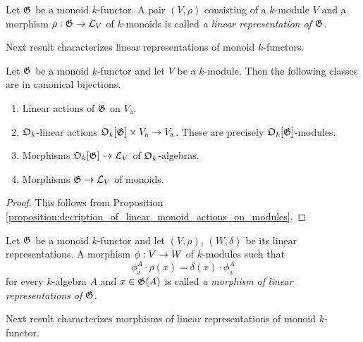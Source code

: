 \begin{definition}
Let ${\mathfrak G}$ be a monoid $k$-functor. A pair $\left(V,\rho\right)$ consisting of a $k$-module $V$ and a morphism $\rho:{\mathfrak G}\rightarrow {\mathcal L}_V$ of $k$-monoids is called \textit{a linear representation of ${\mathfrak G}$}.
\end{definition}
\noindent
Next result characterizes linear representations of monoid $k$-functors.

\begin{corollary}\label{corollary:linear_representations_various_characterizations}
Let ${\mathfrak G}$ be a monoid $k$-functor and let $V$ be a $k$-module. Then the following classes are in canonical bijections.
\begin{enumerate}[label=\emph{\textbf{(\arabic*)}}, leftmargin=1.5em]
\item Linear actions of ${\mathfrak G}$ on $V_{\mathrm{a}}$.
\item ${\mathfrak O}_k$-linear actions ${\mathfrak O}_k[{\mathfrak G}]\times V_{\mathrm{a}}\rightarrow V_{\mathrm{a}}$. These are precisely ${\mathfrak O}_k[{\mathfrak G}]$-modules.
\item Morphisms ${\mathfrak O}_k[{\mathfrak G}]\rightarrow {\mathcal L}_V$ of ${\mathfrak O}_k$-algebras.
\item Morphisms ${\mathfrak G}\rightarrow {\mathcal L}_V$ of monoids.
\end{enumerate}
\end{corollary}
\begin{proof}
This follows from Proposition \ref{proposition:decription_of_linear_monoid_actions_on_modules}.
\end{proof}

\begin{definition}
Let ${\mathfrak G}$ be a monoid $k$-functor and let $(V,\rho)$, $(W,\delta)$ be its linear representations. A morphism $\phi:V\rightarrow W$ of $k$-modules such that
$$\phi_{\mathrm{a}}^A \cdot \rho(x) = \delta(x) \cdot \phi_{\mathrm{a}}^A$$
for every $k$-algebra $A$ and $x\in {\mathfrak G}(A)$ is called \textit{a morphism of linear representations of ${\mathfrak G}$}.
\end{definition}
\noindent
Next result characterizes morphisms of linear representations of monoid $k$-functor.


